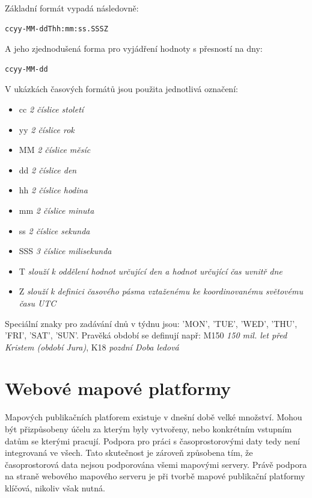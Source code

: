 \noindent
Základní formát vypadá následovně:

\begin{verbatim}
ccyy-MM-ddThh:mm:ss.SSSZ
\end{verbatim}

\noindent
A jeho zjednodušená forma pro vyjádření hodnoty s přesností na dny:

\begin{verbatim}
ccyy-MM-dd
\end{verbatim}

\newpage
\noindent
V ukázkách časových formátů jsou použita jednotlivá označení:

\begin{itemize}
	\item cc \textit{2 číslice století}
	\item yy \textit{2 číslice rok}
	\item MM \textit{2 číslice měsíc}
	\item dd \textit{2 číslice den}
	\item hh \textit{2 číslice hodina}
	\item mm \textit{2 číslice minuta}
	\item ss \textit{2 číslice sekunda}
	\item SSS \textit{3 číslice milisekunda}
\end{itemize}

\begin{itemize}
	\item T \textit{slouží k oddělení hodnot určující den a hodnot určující čas uvnitř dne}
	\item Z \textit{slouží k definici časového pásma vztaženému ke koordinovanému světovému času UTC}
\end{itemize}

Speciální znaky pro zadávání dnů v týdnu jsou: 'MON', 'TUE', 'WED',
'THU', 'FRI', 'SAT', 'SUN'. Pravěká období se definují např: M150
\textit{150 mil. let před Kristem (období Jura)}, K18 \textit{pozdní
  Doba ledová}

\newpage
\section{Webové mapové platformy}
\label{ssec:mapove-platformy}

Mapových publikačních platforem existuje v dnešní době velké
množství. Mohou být přizpůsobeny účelu za kterým byly vytvořeny, nebo
konkrétním vstupním datům se kterými pracují. Podpora pro práci s časoprostorovými daty tedy není integrovaná ve všech. Tato
skutečnost je zároveň způsobena tím, že časoprostorová data nejsou
podporována všemi mapovými servery. Právě podpora na straně webového
mapového serveru je při tvorbě mapové publikační platformy
klíčová, nikoliv však nutná.
 
